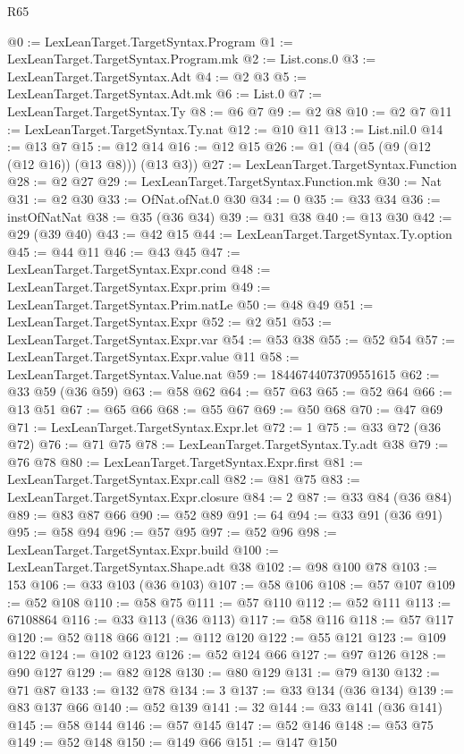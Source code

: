 \begin{lexlean}{R65}
\begin{coremodule}
@0 := LexLeanTarget.TargetSyntax.Program
@1 := LexLeanTarget.TargetSyntax.Program.mk
@2 := List.cons.{0}
@3 := LexLeanTarget.TargetSyntax.Adt
@4 := @2 @3
@5 := LexLeanTarget.TargetSyntax.Adt.mk
@6 := List.{0}
@7 := LexLeanTarget.TargetSyntax.Ty
@8 := @6 @7
@9 := @2 @8
@10 := @2 @7
@11 := LexLeanTarget.TargetSyntax.Ty.nat
@12 := @10 @11
@13 := List.nil.{0}
@14 := @13 @7
@15 := @12 @14
@16 := @12 @15
@26 := @1 (@4 (@5 (@9 (@12 (@12 @16)) (@13 @8))) (@13 @3))
@27 := LexLeanTarget.TargetSyntax.Function
@28 := @2 @27
@29 := LexLeanTarget.TargetSyntax.Function.mk
@30 := Nat
@31 := @2 @30
@33 := OfNat.ofNat.{0} @30
@34 := 0
@35 := @33 @34
@36 := instOfNatNat
@38 := @35 (@36 @34)
@39 := @31 @38
@40 := @13 @30
@42 := @29 (@39 @40)
@43 := @42 @15
@44 := LexLeanTarget.TargetSyntax.Ty.option
@45 := @44 @11
@46 := @43 @45
@47 := LexLeanTarget.TargetSyntax.Expr.cond
@48 := LexLeanTarget.TargetSyntax.Expr.prim
@49 := LexLeanTarget.TargetSyntax.Prim.natLe
@50 := @48 @49
@51 := LexLeanTarget.TargetSyntax.Expr
@52 := @2 @51
@53 := LexLeanTarget.TargetSyntax.Expr.var
@54 := @53 @38
@55 := @52 @54
@57 := LexLeanTarget.TargetSyntax.Expr.value @11
@58 := LexLeanTarget.TargetSyntax.Value.nat
@59 := 18446744073709551615
@62 := @33 @59 (@36 @59)
@63 := @58 @62
@64 := @57 @63
@65 := @52 @64
@66 := @13 @51
@67 := @65 @66
@68 := @55 @67
@69 := @50 @68
@70 := @47 @69
@71 := LexLeanTarget.TargetSyntax.Expr.let
@72 := 1
@75 := @33 @72 (@36 @72)
@76 := @71 @75
@78 := LexLeanTarget.TargetSyntax.Ty.adt @38
@79 := @76 @78
@80 := LexLeanTarget.TargetSyntax.Expr.first
@81 := LexLeanTarget.TargetSyntax.Expr.call
@82 := @81 @75
@83 := LexLeanTarget.TargetSyntax.Expr.closure
@84 := 2
@87 := @33 @84 (@36 @84)
@89 := @83 @87 @66
@90 := @52 @89
@91 := 64
@94 := @33 @91 (@36 @91)
@95 := @58 @94
@96 := @57 @95
@97 := @52 @96
@98 := LexLeanTarget.TargetSyntax.Expr.build
@100 := LexLeanTarget.TargetSyntax.Shape.adt @38
@102 := @98 @100 @78
@103 := 153
@106 := @33 @103 (@36 @103)
@107 := @58 @106
@108 := @57 @107
@109 := @52 @108
@110 := @58 @75
@111 := @57 @110
@112 := @52 @111
@113 := 67108864
@116 := @33 @113 (@36 @113)
@117 := @58 @116
@118 := @57 @117
@120 := @52 @118 @66
@121 := @112 @120
@122 := @55 @121
@123 := @109 @122
@124 := @102 @123
@126 := @52 @124 @66
@127 := @97 @126
@128 := @90 @127
@129 := @82 @128
@130 := @80 @129
@131 := @79 @130
@132 := @71 @87
@133 := @132 @78
@134 := 3
@137 := @33 @134 (@36 @134)
@139 := @83 @137 @66
@140 := @52 @139
@141 := 32
@144 := @33 @141 (@36 @141)
@145 := @58 @144
@146 := @57 @145
@147 := @52 @146
@148 := @53 @75
@149 := @52 @148
@150 := @149 @66
@151 := @147 @150

\end{coremodule}
\end{lexlean}
